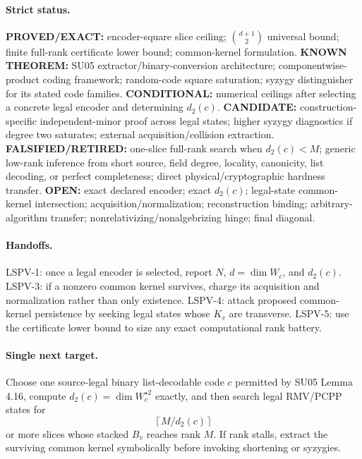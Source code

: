 \documentclass[11pt]{article}
\begin{document}
\paragraph{Strict status.}
\textbf{PROVED/EXACT:} encoder-square slice ceiling; \(\binom{d+1}{2}\) universal bound; finite full-rank certificate lower bound; common-kernel formulation.
\textbf{KNOWN THEOREM:} SU05 extractor/binary-conversion architecture; componentwise-product coding framework; random-code square saturation; syzygy distinguisher for its stated code families.
\textbf{CONDITIONAL:} numerical ceilings after selecting a concrete legal encoder and determining \(d_2(c)\).
\textbf{CANDIDATE:} construction-specific independent-minor proof across legal states; higher syzygy diagnostics if degree two saturates; external acquisition/collision extraction.
\textbf{FALSIFIED/RETIRED:} one-slice full-rank search when \(d_2(c)<M\); generic low-rank inference from short source, field degree, locality, canonicity, list decoding, or perfect completeness; direct physical/cryptographic hardness transfer.
\textbf{OPEN:} exact declared encoder; exact \(d_2(c)\); legal-state common-kernel intersection; acquisition/normalization; reconstruction binding; arbitrary-algorithm transfer; nonrelativizing/nonalgebrizing hinge; final diagonal.

\paragraph{Handoffs.}
LSPV-1: once a legal encoder is selected, report \(N\), \(d=\dim W_c\), and \(d_2(c)\). LSPV-3: if a nonzero common kernel survives, charge its acquisition and normalization rather than only existence. LSPV-4: attack proposed common-kernel persistence by seeking legal states whose \(K_v\) are transverse. LSPV-5: use the certificate lower bound to size any exact computational rank battery.

\paragraph{Single next target.}
Choose one source-legal binary list-decodable code \(c\) permitted by SU05 Lemma 4.16, compute \(d_2(c)=\dim W_c^{\star2}\) exactly, and then search legal RMV/PCPP states for
\[
\left\lceil M/d_2(c)\right\rceil
\]
or more slices whose stacked \(B_v\) reaches rank \(M\). If rank stalls, extract the surviving common kernel symbolically before invoking shortening or syzygies.
\end{document}

